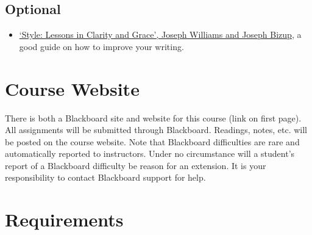 \documentclass[article,oneside]{memoir}
\begin{document}
\subsection{Optional}

\begin{itemize}

\item \href{http://www.amazon.com/Style-Lessons-Clarity-Grace-11th/dp/0321898680/ref=sr_1_1?ie=UTF8&qid=1452356026&sr=8-1&keywords=lessons+in+clarity+and+grace}{`Style: Lessons in Clarity and Grace', Joseph Williams and Joseph Bizup}, a good guide on how to improve your writing. 
\end{itemize}
\section{Course Website}
There is both a Blackboard site and website for this course (link on first page). All assignments will be submitted through Blackboard. Readings, notes, etc. will be posted on the course website. Note that Blackboard difficulties are rare and automatically reported to instructors. Under no circumstance will a student's report of a Blackboard difficulty be reason for an extension. It is your responsibility to contact Blackboard support for help.


\section{Requirements}
\end{document}
